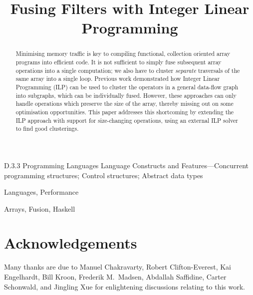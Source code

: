 \documentclass[preprint]{sigplanconf}
\begin{document}
\title{Fusing Filters with Integer Linear Programming}


\maketitle
\makeatactive

\begin{abstract}
Minimising memory traffic is key to compiling functional, collection oriented array programs into efficient code.
It is not sufficient to simply fuse subsequent array operations into a single computation; we also have to cluster \emph{separate} traversals of the same array into a single loop.
Previous work demonstrated how Integer Linear Programming (ILP) can be used to cluster the operators in a general data-flow graph into subgraphs, which can be individually fused.
However, these approaches can only handle operations which preserve the size of the array, thereby missing out on some optimisation opportunities.
This paper addresses this shortcoming by extending the ILP approach with support for size-changing operations, using an external ILP solver to find good clusterings.
\end{abstract}


\category
	{D.3.3}
	{Programming Languages}
	{Language Constructs and Features---Concurrent programming structures; Control structures; Abstract data types}

\terms
	Languages, Performance

\keywords
	Arrays, Fusion, Haskell









\section*{Acknowledgements}
Many thanks are due to
Manuel Chakravarty,
Robert Clifton-Everest,
Kai Engelhardt,
Bill Kroon,
Frederik M.\ Madsen,
Abdallah Saffidine,
Carter Schonwald,
and Jingling Xue
for enlightening discussions relating to this work.



\end{document}
